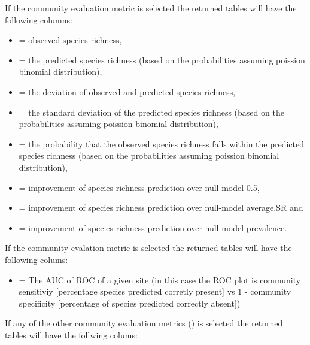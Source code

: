 \documentclass[a4paper]{book}
\begin{document}
\begin{Note}\relax
If the community evaluation metric  is selected the returned tables will have the following columns: 
\begin{itemize}

\item {} = observed species richness, 
\item {} = the predicted species richness (based on the probabilities assuming poission binomial distribution), 
\item {} = the deviation of observed and predicted species richness, 
\item {} = the standard deviation of the predicted species richness (based on the probabilities assuming poission binomial distribution), 
\item {} = the probability that the observed species richness falls within the predicted species richness (based on the probabilities assuming poission binomial distribution), 
\item {} = improvement of species richness prediction over null-model 0.5, 
\item {} = improvement of species richness prediction over null-model average.SR and 
\item {} = improvement of species richness prediction over null-model prevalence.

\end{itemize}


If the community evalation metric  is selected the returned tables will have the following colums: 
\begin{itemize}

\item {} = The AUC of ROC of a given site (in this case the ROC plot is community sensitiviy [percentage species predicted corretly present] vs 1 - community specificity [percentage of species predicted correctly absent])

\end{itemize}


If any of the other community evaluation metrics () is selected the returned tables will have the follwing colums:
\begin{itemize}


\end{itemize}
\end{Note}
\end{document}
